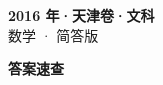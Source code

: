 \documentclass[zihao=-4, a4paper]{ctexart}
\begin{document}
\begin{center}
  {\Large\bfseries 2016 年·天津卷·文科}\\[4pt]
  {\large 数学 · 简答版}
\end{center}
\medskip
{}

\clearpage
{}
\begin{center}{\Large\bfseries 答案速查}\end{center}
\medskip

\end{document}
